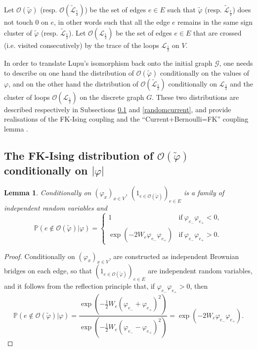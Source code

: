 \documentclass[11pt,a4paper]{amsart}
\numberwithin{equation}{section}
\newtheorem{lemma}[proposition]{Lemma}
\begin{document}
Let $\mathcal{O}(\tilde{\varphi})$ (resp. $\mathcal{O}(\tilde{\mathcal{L}}_{\frac{1}{2}})$) be the set of edges $e\in E$ such that $\tilde{\varphi}$ (resp. $\tilde{\mathcal{L}}_{\frac{1}{2}}$) does not touch $0$ on $e$, in other words such that all the edge $e$ remains in the same sign cluster of $\tilde{\varphi}$ (resp. $\tilde{\mathcal{L}}_{\frac{1}{2}}$). Let $\mathcal{O}(\mathcal{L}_{\frac{1}{2}})$ be the set of edges $e\in E$ that are crossed (i.e. visited consecutively) by the trace of the loops $\mathcal{L}_{\frac{1}{2}}$ on $V$.

In order to translate Lupu's isomorphism back onto the initial graph $\mathcal{G}$, one needs to describe on one hand the distribution of $\mathcal{O}(\tilde{\varphi})$ conditionally on the values of $\varphi$, and on the other hand the distribution of $\mathcal{O}(\tilde{\mathcal{L}}_{\frac{1}{2}})$  conditionally on $\mathcal{L}_{\frac{1}{2}}$ and the cluster of loops $\mathcal{O}(\mathcal{L}_{\frac{1}{2}})$ on the discrete graph $G$. These two distributions are described respectively in Subsections \ref{fkising} and \ref{randomcurrent}, and provide realisations of the  FK-Ising coupling and the ``Current+Bernoulli=FK'' coupling lemma \cite{lupu-werner}.

\subsection{The FK-Ising distribution of $\mathcal{O}(\tilde{\varphi})$ conditionally on $|\varphi|$}
\label{fkising}
\begin{lemma}
\label{lem:fki}
Conditionally on $(\varphi_{x})_{x\in V}$, $(1_{e\in \mathcal{O}(\tilde{\varphi})})_{e\in E}$
is a family of independent random variables and
\begin{displaymath}
\mathbb{P}\left(e\not\in \mathcal{O}(\tilde{\varphi})\vert \varphi\right)=
\left\lbrace
\begin{array}{ll}
1 & \text{if}~ \varphi_{e_{-}}\varphi_{e_{+}}<0,\\ 
\exp\left(-2W_{e}\varphi_{e_{-}}\varphi_{e_{+}}\right)
& \text{if}~ \varphi_{e_{-}}\varphi_{e_{+}}>0.
\end{array} 
\right.
\end{displaymath}
\end{lemma}
\begin{proof}
Conditionally on $(\varphi_{x})_{x\in V}$, are constructed as independent Brownian bridges on each edge, so that $(1_{e\in \mathcal{O}(\tilde{\varphi})})_{e\in E}$ are independent random variables, and it follows from the reflection principle that, if $\varphi_{e_{-}}\varphi_{e_{+}}>0$, then 
$$\mathbb{P}\left(e\not\in \mathcal{O}(\tilde{\varphi})\vert \varphi\right)=\dfrac{\exp\left(-\frac{1}{2}W_{e}(\varphi_{e_{-}}+\varphi_{e_{+}})^{2}\right)}
{\exp\left(-\frac{1}{2}W_{e}(\varphi_{e_{-}}-\varphi_{e_{+}})^{2}\right)}=\exp\left(-2W_{e}\varphi_{e_{-}}\varphi_{e_{+}}\right).$$
\end{proof}
\end{document}
